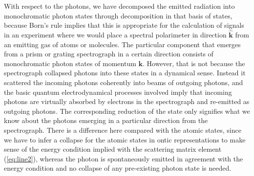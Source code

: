 \documentclass[final,3p,12pt]{elsarticle3}
\begin{document}
With respect to the photons, we have decomposed the emitted radiation into 
monochromatic photon states through decomposition in that basis of states, 
because Born's rule implies that this is appropriate for the calculation 
of signals in an experiment 
where we would place a spectral polarimeter in direction $\hat{\bm{k}}$ from 
an emitting gas of atoms or molecules. The particular component that emerges from 
a prism or grating spectrograph in a certain direction consists of monochromatic 
photon states of momentum $\bm{k}$. However, that is not because the 
spectrograph collapsed photons into these states in a dynamical sense. 
Instead it scattered the incoming photons coherently into beams of outgoing photons, 
and the basic quantum electrodynamical processes involved imply that incoming photons 
are virtually absorbed by electrons in the spectrograph and re-emitted as outgoing 
photons. The corresponding reduction of the state only signifies what we know about 
the photons emerging in a particular direction from the spectrograph.
There is a difference here compared with the atomic states, since we have to
infer a collapse for the atomic states in ontic representations to make
sense of the energy condition implied with the scattering matrix element (\ref{eq:line2}), 
whereas the photon is spontaneously emitted in agreement with the energy 
condition and no collapse of any pre-existing photon state is needed.
\end{document}
